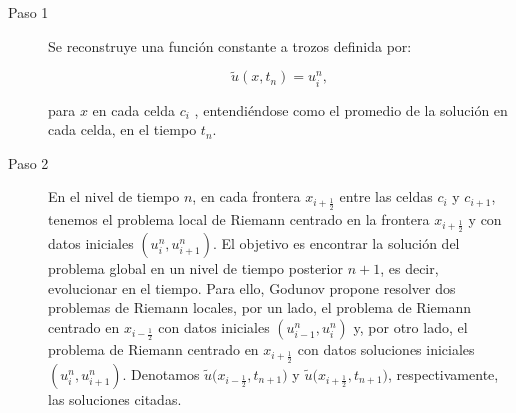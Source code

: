 \begin{description}
  \item[Paso 1]

        Se reconstruye una función constante a trozos definida por:

        \begin{equation*}
          \widetilde{u}
          \left(x,t_{n}\right)=
          u^{n}_{i},
        \end{equation*}

        para $x$ en cada celda $c_{i}$ , entendiéndose como el
        promedio de la solución en cada celda, en el tiempo $t_{n}$.

  \item[Paso 2]

        En el nivel de tiempo $n$, en cada frontera
        $x_{i+\frac{1}{2}}$ entre las celdas $c_{i}$ y $c_{i+1}$,
        tenemos el problema local de Riemann centrado en la frontera
        $x_{i+\frac{1}{2}}$ y con datos iniciales
        \begin{math}
          \left(
          u^{n}_{i},
          u^{n}_{i+1}
          \right)
        \end{math}.
        El objetivo es encontrar la solución del problema global en
        un nivel de tiempo posterior $n+1$, es decir, evolucionar en
        el tiempo.
        Para ello, Godunov propone resolver dos problemas de Riemann
        locales, por un lado, el problema de Riemann centrado en
        $x_{i-\frac{1}{2}}$ con datos iniciales
        \begin{math}
          \left(
          u^{n}_{i-1},u^{n}_{i}
          \right)
        \end{math}
        y, por otro lado, el problema de Riemann centrado en
        $x_{i+\frac{1}{2}}$ con datos soluciones iniciales
        \begin{math}
          \left(
          u^{n}_{i},
          u^{n}_{i+1}
          \right)
        \end{math}.
        Denotamos
        \begin{math}
          \widetilde{u}
          \big(
          x_{i-\frac{1}{2}},
          t_{n+1}
          \big)
        \end{math}
        y
        \begin{math}
          \widetilde{u}
          \big(
          x_{i+\frac{1}{2}},
          t_{n+1}
          \big)
        \end{math},
        respectivamente, las soluciones citadas.


\end{description}
